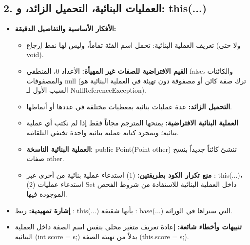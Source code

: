 \documentclass[14pt]{extarticle}
\begin{document}
\subsection*{2. العمليات البنائية، التحميل الزائد، و\textenglish{: this(...)}}
\begin{itemize}[itemsep=0.3em]
    \item \textbf{الأفكار الأساسية والتفاصيل الدقيقة:}
    \begin{itemize}
        \item تعريف العملية البنائية: تحمل اسم الفئة تماماً، وليس لها نمط إرجاع (ولا حتى \textenglish{void}).
        \item \textbf{القيم الافتراضية للصفات غير المهيأة:} الأعداد \textenglish{0}، المنطقي \textenglish{false}، والكائنات والمصفوفات \textenglish{null} (ترك صفة كائن أو مصفوفة دون تهيئة في العملية البنائية هو السبب الأول لـ \textenglish{NullReferenceException}).
        \item \textbf{التحميل الزائد:} عدة عمليات بنائية بمعطيات مختلفة في عددها أو أنماطها.
        \item \textbf{العملية البنائية الافتراضية:} يمنحها المترجم مجاناً فقط إذا لم نكتب أي عملية بنائية؛ وبمجرد كتابة عملية بنائية واحدة تختفي التلقائية.
        \item \textbf{العملية البنائية الناسخة:} \textenglish{public Point(Point other)} تنشئ كائناً جديداً بنسخ صفات \textenglish{other}.
        \item \textbf{منع تكرار الكود بطريقتين:} (1) استدعاء عملية بنائية من أخرى عبر \textenglish{: this(...)}، (2) استدعاء عمليات \textenglish{Set} داخل العملية البنائية للاستفادة من شروط الفحص الموجودة فيها.
    \end{itemize}
    \item \textbf{إشارة تمهيدية:} ربط \textenglish{: this(...)} بأنها شقيقة \textenglish{: base(...)} التي سنراها في الوراثة.
    \item \textbf{تنبيهات وأخطاء شائعة:} إعادة تعريف متغير محلي بنفس اسم الصفة داخل العملية البنائية (\textenglish{int score = s;}) بدلاً من تهيئة الصفة (\textenglish{this.score = s;}).
\end{itemize}

\filbreak
\end{document}
